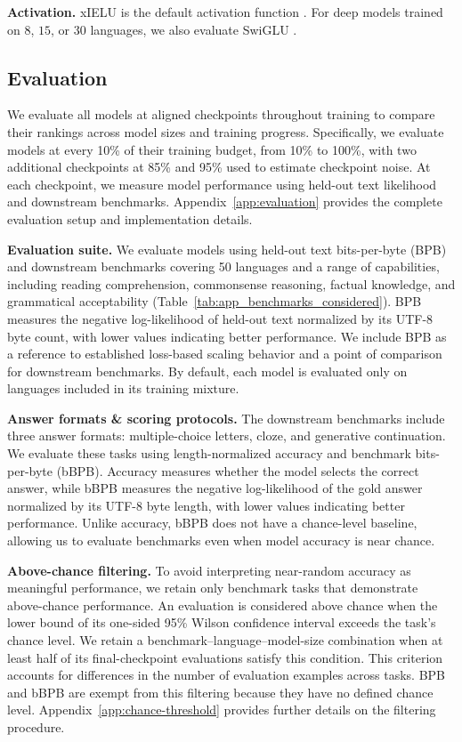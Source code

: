 \textbf{Activation.}
xIELU is the default activation function \citep{huang_xielu_2025}.
For deep models trained on $8$, $15$, or $30$ languages, we also evaluate SwiGLU \citeneeded{}.


\subsection{Evaluation}
\label{subsec:evaluation}

We evaluate all models at aligned checkpoints throughout training to compare their rankings across model sizes and training progress.
Specifically, we evaluate models at every 10\% of their training budget, from 10\% to 100\%, with two additional checkpoints at 85\% and 95\% used to estimate checkpoint noise. 
At each checkpoint, we measure model performance using held-out text likelihood and downstream benchmarks. 
Appendix~\ref{app:evaluation} provides the complete evaluation setup and implementation details.

\textbf{Evaluation suite.}
We evaluate models using held-out text bits-per-byte (BPB) and \nbenchanalysed downstream benchmarks covering 50 languages and a range of capabilities, including reading comprehension, commonsense reasoning, factual knowledge, and grammatical acceptability (Table~\ref{tab:app_benchmarks_considered}).  
BPB measures the negative log-likelihood of held-out text normalized by its UTF-8 byte count, with lower values indicating better performance. 
We include BPB as a reference to established loss-based scaling behavior and a point of comparison for downstream benchmarks. 
By default, each model is evaluated only on languages included in its training mixture.

\textbf{Answer formats \& scoring protocols.}
The downstream benchmarks include three answer formats: multiple-choice letters, cloze, and generative continuation. 
We evaluate these tasks using length-normalized accuracy and benchmark bits-per-byte (bBPB). 
Accuracy measures whether the model selects the correct answer, while bBPB measures the negative log-likelihood of the gold answer normalized by its UTF-8 byte length, with lower values indicating better performance. 
Unlike accuracy, bBPB does not have a chance-level baseline, allowing us to evaluate benchmarks even when model accuracy is near chance.

\textbf{Above-chance filtering.}
To avoid interpreting near-random accuracy as meaningful performance, we retain only benchmark tasks that demonstrate above-chance performance. 
An evaluation is considered above chance when the lower bound of its one-sided 95\% Wilson confidence interval exceeds the task's chance level. 
We retain a benchmark–language–model-size combination when at least half of its final-checkpoint evaluations satisfy this condition. This criterion accounts for differences in the number of evaluation examples across tasks. BPB and bBPB are exempt from this filtering because they have no defined chance level. 
Appendix~\ref{app:chance-threshold} provides further details on the filtering procedure.


